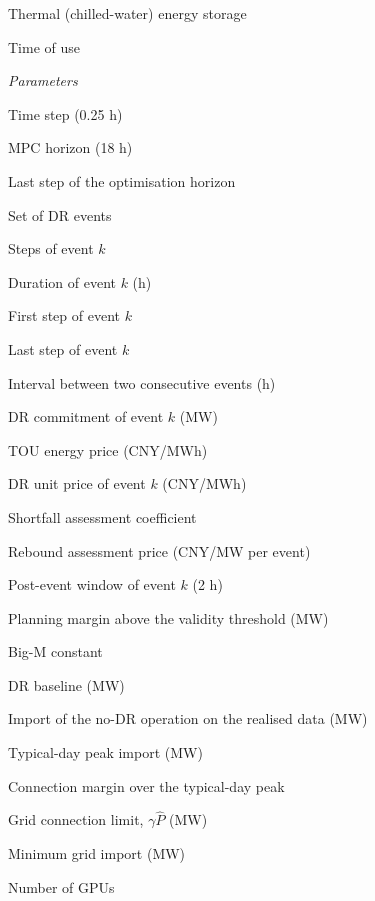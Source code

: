 \documentclass[a4paper,twocolumn,fleqn,10pt]{article}
\begin{document}
{\begin{nomlist}
\item[{TES}] Thermal (chilled-water) energy storage
\item[{TOU}] Time of use
\end{nomlist}
\par\vspace{3pt}\noindent\textit{Parameters}\par
\begin{nomlist}
\item[{\(\Delta t\)}] Time step (0.25 h)
\item[{\(T_H\)}] MPC horizon (18 h)
\item[{\(T\)}] Last step of the optimisation horizon
\item[{\(\mathcal K\)}] Set of DR events
\item[{\(\mathcal T_k\)}] Steps of event \(k\)
\item[{\(D_k\)}] Duration of event \(k\) (h)
\item[{\(s_k\)}] First step of event \(k\)
\item[{\(e_k\)}] Last step of event \(k\)
\item[{\(\tau\)}] Interval between two consecutive events (h)
\item[{\(C_k\)}] DR commitment of event \(k\) (MW)
\item[{\(\pi_t\)}] TOU energy price (CNY/MWh)
\item[{\(\pi_k\)}] DR unit price of event \(k\) (CNY/MWh)
\item[{\(\kappa\)}] Shortfall assessment coefficient
\item[{\(c^{rb}\)}] Rebound assessment price (CNY/MW per event)
\item[{\(\mathcal W_k\)}] Post-event window of event \(k\) (2 h)
\item[{\(\delta^{val}\)}] Planning margin above the validity threshold (MW)
\item[{\(M\)}] Big-M constant
\item[{\(P^{base}_t\)}] DR baseline (MW)
\item[{\(P^{noDR}_t\)}] Import of the no-DR operation on the realised data (MW)
\item[{\(\hat P\)}] Typical-day peak import (MW)
\item[{\(\gamma\)}] Connection margin over the typical-day peak
\item[{\(P^{cap}\)}] Grid connection limit, \(\gamma\hat P\) (MW)
\item[{\(P^{min}\)}] Minimum grid import (MW)
\item[{\(N^{GPU}\)}] Number of GPUs

\end{nomlist}}
\end{document}
